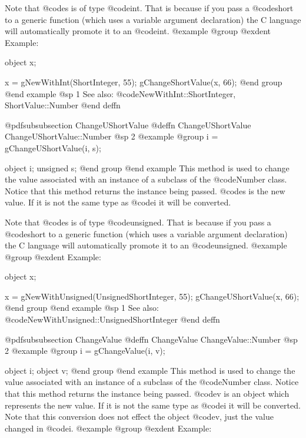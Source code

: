 Note that @code{s} is of type @code{int}.  That is because if you pass a
@code{short} to a generic function (which uses a variable argument
declaration) the C language will automatically promote it to an
@code{int}.
@example
@group
@exdent Example:

object  x;

x = gNewWithInt(ShortInteger, 55);
gChangeShortValue(x, 66);
@end group
@end example
@sp 1
See also:  @code{NewWithInt::ShortInteger, ShortValue::Number}
@end deffn









@pdfsubsubsection {ChangeUShortValue}
@deffn {ChangeUShortValue} ChangeUShortValue::Number
@sp 2
@example
@group
i = gChangeUShortValue(i, s);

object  i;
unsigned  s;
@end group
@end example
This method is used to change the value associated with an instance of
a subclass of the @code{Number} class.  Notice that this method
returns the instance being passed.  @code{s} is the new value.
If it is not the same type as @code{i} it will be converted.

Note that @code{s} is of type @code{unsigned}.  That is because if you pass a
@code{short} to a generic function (which uses a variable argument
declaration) the C language will automatically promote it to an
@code{unsigned}.
@example
@group
@exdent Example:

object  x;

x = gNewWithUnsigned(UnsignedShortInteger, 55);
gChangeUShortValue(x, 66);
@end group
@end example
@sp 1
See also:  @code{NewWithUnsigned::UnsignedShortInteger}
@end deffn










@pdfsubsubsection {ChangeValue}
@deffn {ChangeValue} ChangeValue::Number
@sp 2
@example
@group
i = gChangeValue(i, v);

object  i;
object  v;
@end group
@end example
This method is used to change the value associated with an instance of a
subclass of the @code{Number} class.  Notice that this method returns
the instance being passed.  @code{v} is an object which represents the
new value.  If it is not the same type as @code{i} it will be converted.
Note that this conversion does not effect the object @code{v}, just
the value changed in @code{i}.
@example
@group
@exdent Example:

